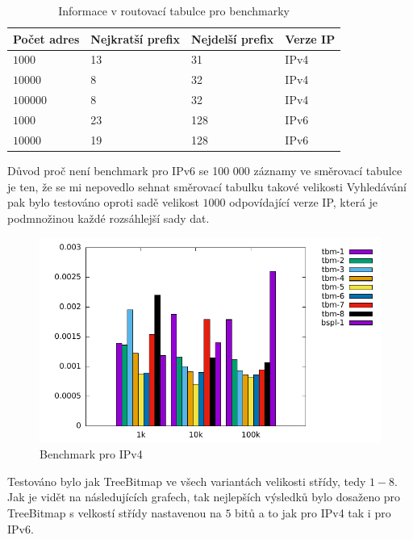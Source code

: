 \begin{table}[!htbp]
	\center
	\label{tab:lpm-input}
    \begin{tabular}{|l|l|l|l|}
    \hline
    Počet adres & Nejkratší prefix & Nejdelší prefix & Verze IP \\ \hline
    $1000$ & 13 & 31 & IPv4 \\ \hline
    $10000$ & 8 & 32 & IPv4 \\ \hline
    $100000$ & 8 & 32 & IPv4 \\ \hline
    $1000$ & 23 & 128 & IPv6 \\ \hline
    $10000$ & 19 & 128 & IPv6 \\ \hline
    \end{tabular}
	\caption{Informace v routovací tabulce pro benchmarky}
\end{table}

Důvod proč není benchmark pro IPv6 se 100 000 záznamy ve směrovací tabulce je ten, že se mi nepovedlo
sehnat směrovací tabulku takové velikosti
Vyhledávání pak bylo testováno oproti sadě velikost $1000$ odpovídající verze IP, která je podmnožinou každé
rozsáhlejší sady dat.

\begin{figure}[!htbp]
	\centering
	\includegraphics[scale=1]{fig/lpm-ipv4.pdf}
	\caption{Benchmark pro IPv4}
\end{figure}\label{fig:lpm-ipv4}

Testováno bylo jak TreeBitmap ve všech variantách velikosti střídy, tedy $1-8$.
Jak je vidět na následujících grafech, tak nejlepších výsledků bylo dosaženo pro TreeBitmap s velkostí
střídy nastavenou na $5$ bitů a to jak pro IPv4 tak i pro IPv6.

